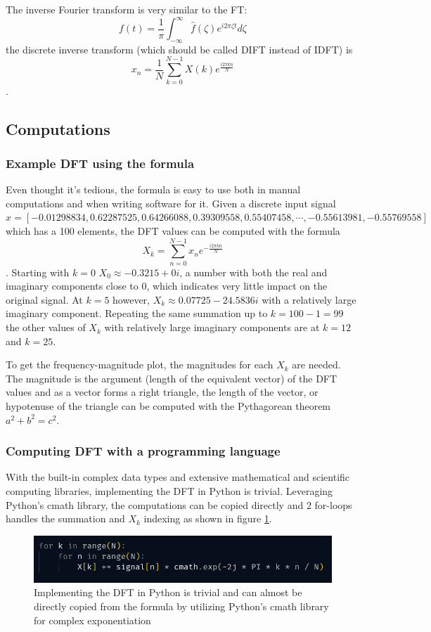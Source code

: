 The inverse Fourier transform is very similar to the FT:
$$ f(t) = \frac{1}{\pi}\int_{-\infty}^{\infty} \hat{f}(\zeta)e^{i2\pi\zeta t} d\zeta$$
the discrete inverse transform (which should be called DIFT instead of IDFT) is 
$$ x_n = \frac{1}{N}\sum_{k=0}^{N-1} X(k)e^{\frac{i2\pi kn}{N}}$$.

\subsection{Computations}
\subsubsection{Example DFT using the formula}
Even thought it's tedious, the formula is easy to use both in manual computations and when writing software for it. Given a discrete input signal $x = [-0.01298834,  0.62287525,  0.64266088,  0.39309558,  0.55407458, \cdots , -0.55613981, -0.55769558]$ which has a 100 elements, the DFT values can be computed with the formula $$X_k = \sum_{n=0}^{N-1} x_ne^{-\frac{i2\pi kn}{N}}$$. Starting with $k=0$ $X_0 \approx -0.3215+0i$, a number with both the real and imaginary components close to 0, which indicates very little impact on the original signal. At $k=5$ however, $X_k \approx 0.07725-24.5836i$ with a relatively large imaginary component. Repeating the same summation up to $k=100-1 = 99$ the other values of $X_k$ with relatively large imaginary components are at $k=12$ and $k=25$. 

To get the frequency-magnitude plot, the magnitudes for each $X_k$ are needed. The magnitude is the argument (length of the equivalent vector) of the DFT values and as a vector forms a right triangle, the length of the vector, or hypotenuse of the triangle can be computed with the Pythagorean theorem $a^2 + b^2 = c^2$. 


\subsubsection{Computing DFT with a programming language}
With the built-in complex data types and extensive mathematical and scientific computing libraries, implementing the DFT in Python is trivial. Leveraging Python's cmath library, the computations can be copied directly and 2 for-loops handles the summation and $X_k$ indexing as shown in figure \ref{fig:pyDFT}.

\begin{figure}[ht]
    \centering
    \includegraphics[width=\textwidth]{./images/pyDFT.png}
    \caption{Implementing the DFT in Python is trivial and can almost be directly copied from the formula by utilizing Python's cmath library for complex exponentiation \label{fig:pyDFT}}
\end{figure}

